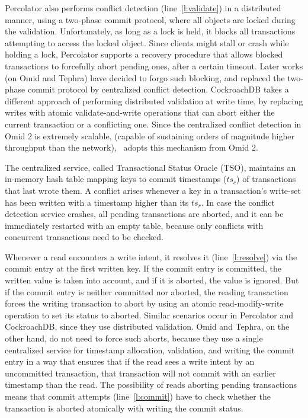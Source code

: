 Percolator also performs conflict detection (line~\ref{l:validate}) in a distributed manner, using a two-phase commit protocol, where all objects are locked during the validation.  Unfortunately, as long as a lock is held, it blocks all transactions attempting to access the locked object. Since clients might stall or 
crash while holding a lock, Percolator supports a recovery procedure that allows blocked transactions to forcefully abort pending ones, 
after a certain timeout. Later works (on Omid and Tephra) have decided to forgo such blocking, and replaced the two-phase commit protocol by 
centralized conflict detection. CockroachDB takes a different approach of performing distributed validation at write time, by replacing writes with atomic validate-and-write operations that can abort either the current transaction or a conflicting one. Since the centralized conflict detection in Omid 2 is extremely scalable, (capable of sustaining orders of magnitude higher throughput than the network), 
\sys\ adopts this mechanism from Omid 2. 

The centralized service, called Transactional Status Oracle (TSO), maintains an in-memory hash table mapping keys to 
commit timestamps ($ts_c$) of transactions that last wrote them. A conflict arises whenever a key in a transaction's write-set has been written 
with a timestamp higher than its $ts_r$. 
In case the conflict detection service crashes, all pending transactions are aborted, and it can be immediately restarted with an empty table, because only conflicts with concurrent transactions need to be checked. 

Whenever a read encounters a write intent, it resolves it (line~\ref{l:resolve}) via the commit entry at the first written key. 
If the commit entry is committed, the written value is taken into account, and if it is aborted, the value is ignored. 
But if the commit entry is neither committed nor aborted, the reading transaction forces the writing transaction to abort by using 
an atomic read-modify-write operation to set its status to aborted. Similar scenarios occur in Percolator and CockroachDB, since 
they use distributed validation. Omid and Tephra, on the other hand, do not need to force such aborts, because they use a single centralized service for timestamp allocation, validation, and writing the commit entry in a way that ensures that  if the read sees a write intent by an uncommitted transaction, that transaction will not commit with an earlier timestamp than the read.
%
The possibility of reads aborting pending transactions means that commit attempts (line~\ref{l:commit}) have to  
check whether the transaction is aborted atomically with writing the commit status.


